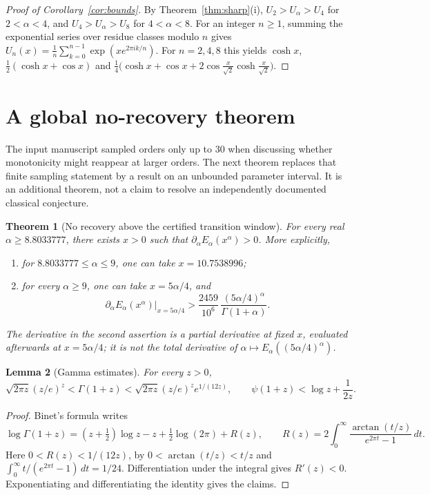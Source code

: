 \documentclass[11pt,a4paper]{article}
\theoremstyle{plain}
\newtheorem{theorem}{Theorem}[section]
\newtheorem{lemma}[theorem]{Lemma}
\theoremstyle{remark}
\begin{document}
\begin{proof}[Proof of Corollary~\ref{cor:bounds}]
By Theorem~\ref{thm:sharp}(i), $U_2>U_\alpha>U_4$ for $2<\alpha<4$, and $U_4>U_\alpha>U_8$ for
$4<\alpha<8$. For an integer $n\ge1$, summing the exponential series over residue classes modulo
$n$ gives $U_n(x)=\frac1n\sum_{k=0}^{n-1}\exp(xe^{2\pi ik/n})$. For $n=2,4,8$ this yields $\cosh x$,
$\frac12(\cosh x+\cos x)$ and
$\frac14\bigl(\cosh x+\cos x+2\cos\frac{x}{\sqrt2}\cosh\frac{x}{\sqrt2}\bigr)$.
\end{proof}

\section{A global no-recovery theorem}
\label{sec:no-recovery}
The input manuscript sampled orders only up to $30$ when discussing
whether monotonicity might reappear at larger orders. The next theorem
replaces that finite sampling statement by a result on an unbounded
parameter interval. It is an additional theorem, not a claim to resolve
an independently documented classical conjecture.

\begin{theorem}[No recovery above the certified transition window]
\label{thm:no-recovery}
For every real $\alpha\ge 8.8033777$, there exists $x>0$ such that
$\partial_\alpha E_\alpha(x^\alpha)>0$. More explicitly,
\begin{enumerate}
\item for $8.8033777\le\alpha\le9$, one can take $x=10.7538996$;
\item for every $\alpha\ge9$, one can take $x=5\alpha/4$, and
\[
 \left.\partial_\alpha E_\alpha(x^\alpha)\right|_{x=5\alpha/4}
 >\frac{2459}{10^6}\,
 \frac{(5\alpha/4)^\alpha}{\Gamma(1+\alpha)}.
\]
\end{enumerate}
The derivative in the second assertion is a partial derivative at fixed
$x$, evaluated afterwards at $x=5\alpha/4$; it is not the total derivative
of $\alpha\mapsto E_\alpha((5\alpha/4)^\alpha)$.
\end{theorem}

\begin{lemma}[Gamma estimates]
\label{lem:gamma-no-recovery}
For every $z>0$,
\[
 \sqrt{2\pi z}(z/e)^z<\Gamma(1+z)
 <\sqrt{2\pi z}(z/e)^z e^{1/(12z)},
 \qquad \psi(1+z)<\log z+\frac1{2z}.
\]
\end{lemma}
\begin{proof}
Binet's formula \cite[5.9.10]{DLMF} writes
\[
 \log\Gamma(1+z)=(z+\tfrac12)\log z-z+
 \tfrac12\log(2\pi)+R(z),\qquad
 R(z)=2\int_0^\infty\frac{\arctan(t/z)}{e^{2\pi t}-1}\,dt.
\]
Here $0<R(z)<1/(12z)$, by $0<\arctan(t/z)<t/z$ and
$\int_0^\infty t/(e^{2\pi t}-1)\,dt=1/24$.
Differentiation under the integral gives $R'(z)<0$.
Exponentiating and differentiating the identity gives the claims.
\end{proof}
\end{document}
